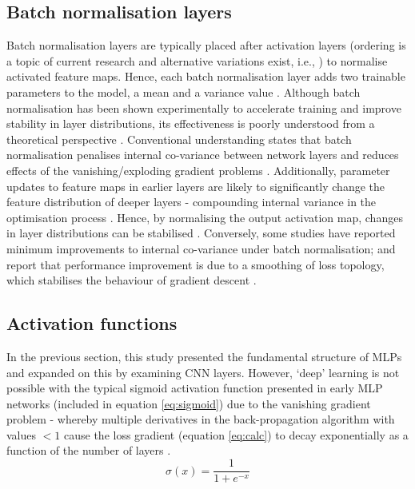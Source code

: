 \subsection{Batch normalisation layers}
Batch normalisation layers are typically placed after activation layers
(ordering is a topic of current research and alternative variations exist, i.e.,
\cite{Kazemifar_2018}) to normalise activated feature maps. Hence, each batch
normalisation layer adds two trainable parameters to the model, a mean and a
variance value \cite{Lundervold2019}. Although batch normalisation has been
shown experimentally to accelerate training and improve stability in layer
distributions, its effectiveness is poorly understood from a theoretical
perspective \cite{santurkar2018}. Conventional understanding states that batch
normalisation penalises internal co-variance between network layers
\cite{ioffe2015} and reduces effects of the vanishing/exploding gradient
problems \cite{Li2014}. Additionally, parameter updates to feature maps in
earlier layers are likely to significantly change the feature distribution of
deeper layers - compounding internal variance in the optimisation process
\cite{santurkar2018}. Hence, by normalising the output activation map, changes
in layer distributions can be stabilised \cite{santurkar2018}. Conversely, some
studies have reported minimum improvements to internal co-variance under batch
normalisation; and report that performance improvement is due to a smoothing of
loss topology, which stabilises the behaviour of gradient descent
\cite{santurkar2018}.

\subsection{Activation functions}
\label{sec:act} In the previous section, this study presented the fundamental
structure of MLPs and expanded on this by examining CNN layers. However, `deep'
learning is not possible with the typical sigmoid activation function presented
in early MLP networks \cite{Lundervold2019} (included in equation
\ref{eq:sigmoid}) due to the vanishing gradient problem - whereby multiple
derivatives in the back-propagation algorithm with values $<1$ cause the loss
gradient (equation \ref{eq:calc}) to decay exponentially as a function of the
number of layers \cite{Lundervold2019}.
\begin{equation}
\sigma(x) = \frac{1}{1+e^{-x}}
\label{eq:sigmoid}
\end{equation}

